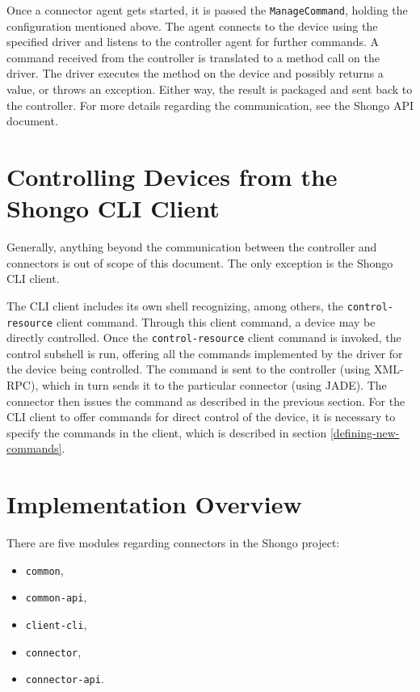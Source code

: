 Once a connector agent gets started, it is passed the \texttt{ManageCommand}, holding the configuration mentioned above. The agent connects to the device using the specified driver and listens to the controller agent for further commands. A command received from the controller is translated to a method call on the driver. The driver executes the method on the device and possibly returns a value, or throws an exception. Either way, the result is packaged and sent back to the controller. For more details regarding the communication, see the Shongo API document.


\section{Controlling Devices from the Shongo CLI Client}

Generally, anything beyond the communication between the controller and connectors is out of scope of this document. The only exception is the Shongo CLI client.

The CLI client includes its own shell recognizing, among others, the \texttt{control-resource} client command. Through this client command, a device may be directly controlled. Once the \texttt{control-resource} client command is invoked, the control subshell is run, offering all the commands implemented by the driver for the device being controlled. The command is sent to the controller (using XML-RPC), which in turn sends it to the particular connector (using JADE). The connector then issues the command as described in the previous section. For the CLI client to offer commands for direct control of the device, it is necessary to specify the commands in the client, which is described in section \ref{defining-new-commands}.


\section{Implementation Overview}

There are five modules regarding connectors in the Shongo project:
\begin{itemize}
\item \texttt{common},
\item \texttt{common-api},
\item \texttt{client-cli},
\item \texttt{connector},
\item \texttt{connector-api}.
\end{itemize}

